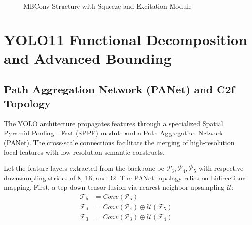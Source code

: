 \documentclass[11pt, letterpaper, oneside, openany]{book}
\begin{document}
\begin{figure}[htbp]
    \centering
    \caption{MBConv Structure with Squeeze-and-Excitation Module}
\end{figure}

\chapter{YOLO11 Functional Decomposition and Advanced Bounding}

\section{Path Aggregation Network (PANet) and C2f Topology}
The YOLO architecture propagates features through a specialized Spatial Pyramid Pooling - Fast (SPPF) module and a Path Aggregation Network (PANet). The cross-scale connections facilitate the merging of high-resolution local features with low-resolution semantic constructs.

Let the feature layers extracted from the backbone be $\mathcal{P}_3, \mathcal{P}_4, \mathcal{P}_5$ with respective downsampling strides of 8, 16, and 32. 
The PANet topology relies on bidirectional mapping. First, a top-down tensor fusion via nearest-neighbor upsampling $\mathcal{U}$:
\begin{align}
    \mathcal{F}_5 &= Conv(\mathcal{P}_5) \\
    \mathcal{F}_4 &= Conv(\mathcal{P}_4) \oplus \mathcal{U}(\mathcal{F}_5) \\
    \mathcal{F}_3 &= Conv(\mathcal{P}_3) \oplus \mathcal{U}(\mathcal{F}_4)
\end{align}
\end{document}
